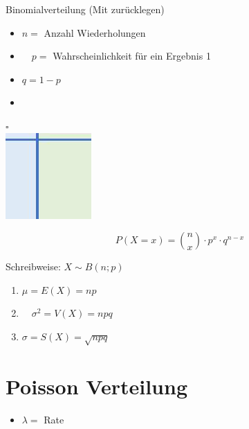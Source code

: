 \documentclass[10pt]{article}
\begin{document}
Binomialverteilung (Mit zurücklegen)

\begin{itemize}
  \item $n=$ Anzahl Wiederholungen
  \item $\quad p=$ Wahrscheinlichkeit für ein Ergebnis 1
  \item $q=1-p$
  \item 
\end{itemize}

$\square$\\
\includegraphics[max width=\textwidth, center]{2024_12_29_e932069dd64ad17e4875g-07}

$$
P(X=x)=\binom{n}{x} \cdot p^{x} \cdot q^{n-x}
$$

Schreibweise: $X \sim B(n ; p)$

\begin{enumerate}
  \item $\mu=E(X)=n p$
  \item $\quad \sigma^{2}=V(X)=n p q$
  \item $\sigma=S(X)=\sqrt{n p q}$
\end{enumerate}

\section*{Poisson Verteilung}
\begin{itemize}
  \item $\lambda=$ Rate
\end{itemize}
\end{document}
